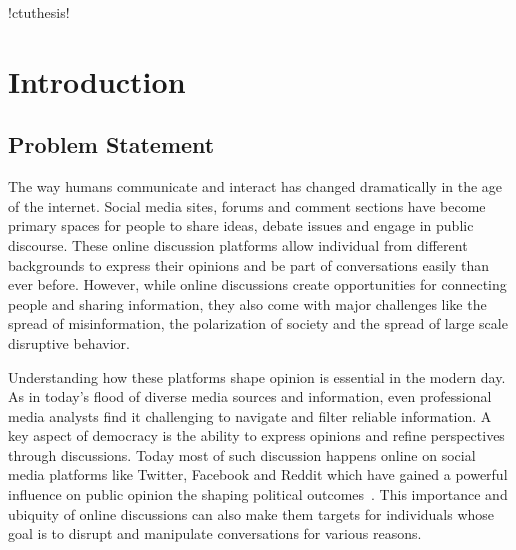 \documentclass[twoside]{ctuthesis}
\theoremstyle{plain}
\theoremstyle{definition}
\theoremstyle{note}
\begin{document}
\renewcommand \ctulstsep{0pt}

\newcommand\ctuclsname{\leavevmode\unhcopy\ctuclsnamebox}
\newsavebox\ctuclsnamebox
\begin{lrbox}{\ctuclsnamebox}
\ctulst!ctuthesis!
\end{lrbox}

\maketitle

\chapter{Introduction}

\section{Problem Statement}
\par
The way humans communicate and interact has changed dramatically in the age of the internet. Social media sites, forums and comment sections have become primary spaces for people to share ideas, debate issues and engage in public discourse. These online discussion platforms allow individual from different backgrounds to express their opinions and be part of conversations easily than ever before. However, while online discussions create opportunities for connecting people and sharing information, they also come with major challenges like the spread of misinformation, the polarization of society and the spread of large scale disruptive behavior.\par

Understanding how these platforms shape opinion is essential in the modern day. As in today's flood of diverse media sources and information, even professional media analysts find it challenging to navigate and filter reliable information. A key aspect of democracy is the ability to express opinions and refine perspectives through discussions. Today most of such discussion happens online on social media platforms like Twitter, Facebook and Reddit which have gained a powerful influence on public opinion the shaping political outcomes~\cite{Bennett2012DigitalMedia}. This importance and ubiquity of online discussions can also make them targets for individuals whose goal is to disrupt and manipulate conversations for various reasons.\par
\end{document}
